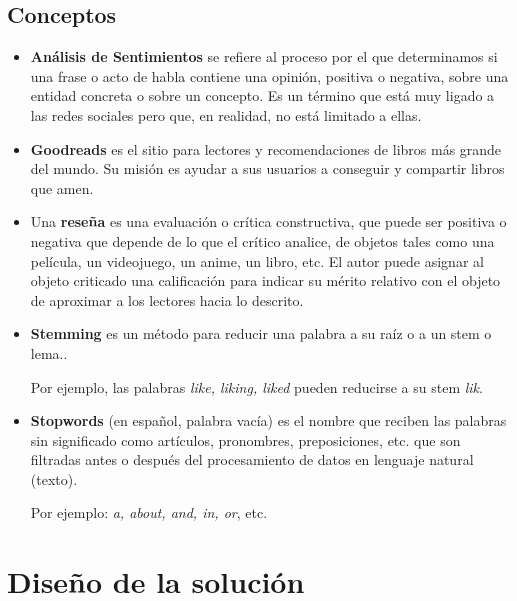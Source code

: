 \documentclass[hidelinks]{sig-alternate-05-2015}
\begin{document}
\subsection{Conceptos}
\begin{itemize}

\item \textbf{Análisis de Sentimientos} se refiere al proceso por el que determinamos si una frase o acto de habla contiene una opinión, positiva o negativa, sobre una entidad concreta o sobre un concepto. Es un término que está muy ligado a las redes sociales pero que, en realidad, no está limitado a ellas.\cite{delgado:analisis}

\item \textbf{Goodreads} es el sitio para lectores y recomendaciones de libros más grande del mundo. Su misión es ayudar a sus usuarios a conseguir y compartir libros que amen.\cite{chandler:goodreads}

\item Una \textbf{reseña} es una evaluación o crítica constructiva, que puede ser positiva o negativa que depende de lo que el crítico analice, de objetos tales como una película, un videojuego, un anime, un libro, etc. El autor puede asignar al objeto criticado una calificación para indicar su mérito relativo con el objeto de aproximar a los lectores hacia lo descrito.\cite{wikipedia:review}

\item \textbf{Stemming} es un método para reducir una palabra a su raíz o a un stem o lema.\cite{wikipedia:stemming}.

Por ejemplo, las palabras \textit{like, liking, liked} pueden reducirse a su stem \textit{lik}.

\item \textbf{Stopwords} (en español, palabra vacía) es el nombre que reciben las palabras sin significado como artículos, pronombres, preposiciones, etc. que son filtradas antes o después del procesamiento de datos en lenguaje natural (texto).\cite{wikipedia:stopwords}

Por ejemplo: \textit{a, about, and, in, or}, etc.

\end{itemize}

\section{Diseño de la solución}
\end{document}
